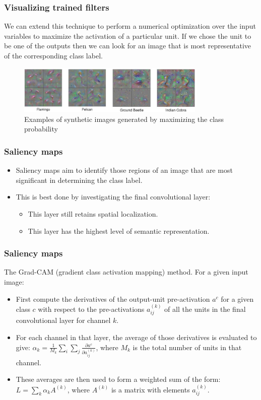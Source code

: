 \documentclass{beamer}
\begin{document}
\begin{frame}
    \frametitle{Visualizing trained filters}
    We can extend this technique to perform a numerical optimization over the input variables to maximize the activation of a particular unit. If we chose the unit to be one of the outputs then we can look for an image that is most representative of the corresponding class label.
    \begin{figure}
        \caption{Examples of synthetic images generated by maximizing the class probability}
        \includegraphics[width=0.8\textwidth]{Figure_14.pdf}
    \end{figure}
\end{frame}

\begin{frame}
    \frametitle{Saliency maps}
    \begin{itemize}
        \item Saliency maps aim to identify those regions of an image that are most significant in determining the class label.
        \item This is best done by investigating the final convolutional layer:
        \begin{itemize}
            \item This layer still retains spatial localization.
            \item This layer has the highest level of semantic representation.
        \end{itemize}
    \end{itemize}
\end{frame}

\begin{frame}
    \frametitle{Saliency maps}
    The Grad-CAM (gradient class activation mapping) method. For a given input image:
    \begin{itemize}
        \item First compute the derivatives of the output-unit pre-activation $a^{c}$ for a given class $c$ with respect to the pre-activations $a_{ij}^{(k)}$ of all the units in the final convolutional layer for channel $k$.
        \item For each channel in that layer, the average of those derivatives is evaluated to give: $\alpha_{k}=\frac{1}{M_{k}}\sum_{i}\sum_{j}\frac{\partial{}a^{c}}{\partial{}a_{ij}^{(k)}}$, where $M_{k}$ is the total number of units in that channel.
        \item These averages are then used to form a weighted sum of the form: $L=\sum_{k}\alpha_{k}A^{(k)}$, where $A^{(k)}$ is a matrix with elements $a_{ij}^{(k)}$.
    \end{itemize}
\end{frame}
\end{document}
